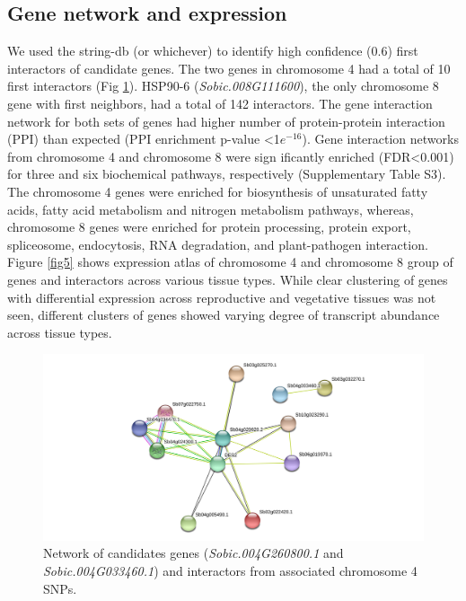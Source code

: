 \documentclass[10pt,letterpaper]{article}
\begin{document}
\subsection*{Gene network and expression}
We used the string-db (or whichever) to identify high confidence (0.6) first interactors of candidate genes. The two genes in chromosome 4 had a total of 10 first interactors (Fig \ref{fig4}). HSP90-6 (\textit{Sobic.008G111600}), the only chromosome 8 gene with first neighbors, had a total of 142 interactors. The gene interaction network for both sets of genes had higher number of protein-protein interaction (PPI) than expected (PPI enrichment p-value \textless 1$e^{-16}$). Gene interaction networks from chromosome 4 and chromosome 8 were sign ificantly enriched (FDR\textless 0.001) for three and six biochemical pathways, respectively (Supplementary Table S3). The chromosome 4 genes were enriched for biosynthesis of unsaturated fatty acids, fatty acid metabolism and nitrogen metabolism pathways, whereas, chromosome 8 genes were enriched for protein processing, protein export, spliceosome, endocytosis, RNA degradation, and plant-pathogen interaction. Figure \ref{fig5} shows expression atlas of chromosome 4 and chromosome 8 group of genes and interactors across various tissue types. While clear clustering of genes with differential expression across reproductive and vegetative tissues was not seen, different clusters of genes showed varying degree of transcript abundance across tissue types.

\begin{figure}
    \includegraphics[width=\textwidth]{Figure4}
    \caption{Network of candidates genes (\textit{Sobic.004G260800.1} and \textit{Sobic.004G033460.1}) and interactors from associated chromosome 4 SNPs.}
    \label{fig4}
\end{figure}
\end{document}
